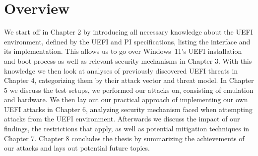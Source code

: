 \section*{Overview}

We start off in Chapter 2 by introducing all necessary knowledge about the \ac{UEFI} environment, defined by the \ac{UEFI} and \ac{PI} specifications, listing the interface and its implementation.
This allows us to go over Windows~11's \ac{UEFI} installation and boot process as well as relevant security mechanisms in Chapter 3.
With this knowledge we then look at analyses of previously discovered \ac{UEFI} threats in Chapter 4, categorizing them by their attack vector and threat model.
In Chapter 5 we discuss the test setups, we performed our attacks on, consisting of emulation and hardware.
We then lay out our practical approach of implementing our own \ac{UEFI} attacks in Chapter 6, analyzing security mechanism faced when attempting attacks from the UEFI environment.
Afterwards we discuss the impact of our findings, the restrictions that apply, as well as potential mitigation techniques in Chapter 7.
Chapter 8 concludes the thesis by summarizing the achievements of our attacks and lays out potential future topics.
